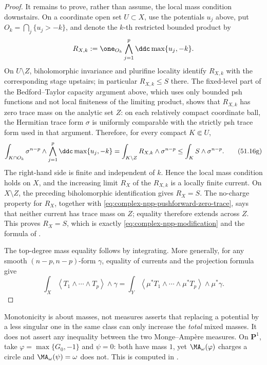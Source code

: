 \begin{proof}
It remains to prove, rather than assume, the local mass condition downstairs.
On a coordinate open set $U\subset X$, use the potentials $u_j$ above,
put $O_k=\bigcap_j\{u_j>-k\}$, and denote the $k$-th restricted bounded
product by
\[
 R_{X,k}:=\one_{O_k}\bigwedge_{j=1}^p
                         \ddc\max\{u_j,-k\}.
\]
On $U\setminus Z$, biholomorphic invariance and plurifine locality identify
$R_{X,k}$ with the corresponding stage upstairs; in particular
$R_{X,k}\leq S$ there.  The fixed-level part of the Bedford--Taylor capacity
argument above, which uses only bounded psh functions and not local finiteness
of the limiting product, shows that $R_{X,k}$ has zero trace mass on the
analytic set $Z$: on each relatively compact coordinate ball, the Hermitian
trace form $\sigma$ is uniformly comparable with the strictly psh trace
form used in that argument.  Therefore, for every compact $K\Subset U$,
\[
 \int_{K\cap O_k}\sigma^{n-p}\wedge
       \bigwedge_{j=1}^p\ddc\max\{u_j,-k\}
 =\int_{K\setminus Z}R_{X,k}\wedge\sigma^{n-p}
 \leq\int_K S\wedge\sigma^{n-p}.
\tag{51.16g}\label{eq:complex-npp-modification-local-mass}
\]
The right-hand side is finite and independent of $k$.  Hence the local
mass condition holds on $X$, and the increasing limit $R_X$ of the
$R_{X,k}$ is a locally finite current.  On $X\setminus Z$, the preceding
biholomorphic identification gives $R_X=S$.  The no-charge property for
$R_X$, together with \eqref{eq:complex-npp-pushforward-zero-trace}, says
that neither current has trace mass on $Z$; equality therefore extends
across $Z$.  This proves
$R_X=S$, which is exactly \eqref{eq:complex-npp-modification} and the
formula of \cite[Remark~1.7]{BEGZ10}.

The top-degree mass equality follows by integrating.  More generally, for
any smooth $(n-p,n-p)$-form $\gamma$, equality of currents and the
projection formula give
\[
 \int_X\left\langle T_1\wedge\cdots\wedge T_p\right\rangle\wedge\gamma
 =\int_Y\left\langle\mu^*T_1\wedge\cdots\wedge\mu^*T_p\right\rangle
              \wedge\mu^*\gamma .
\]
\end{proof}

\begin{warning}{Monotonicity is about masses, not measures}
\label{warn:ch51-monotonicity}
 asserts that replacing a potential by a
less singular one in the same class can only increase the \emph{total}
mixed masses.  It does not assert any inequality between the two
Monge--Amp\`ere measures.  On $\mathbf P^1$, take $\varphi=\max\{G_0,
-1\}$ and $\psi=0$: both have mass $1$, yet
$\MA_\omega(\varphi)$ charges a circle and $\MA_\omega(\psi)=\omega$
does not.  This is computed in .
\end{warning}


